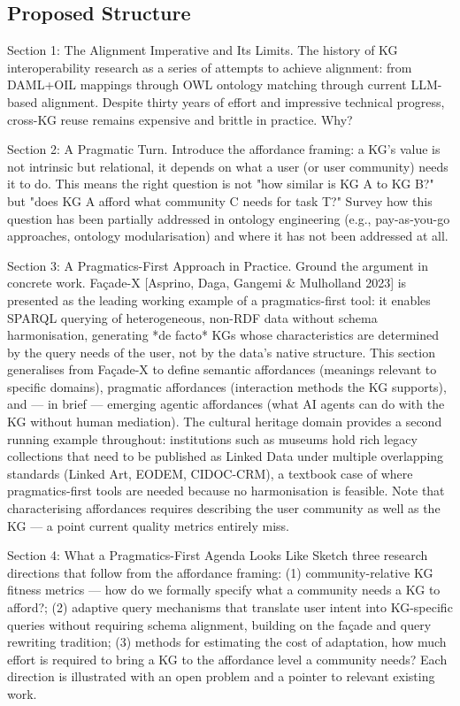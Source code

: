\subsection*{Proposed Structure}

Section 1: The Alignment Imperative and Its Limits. The history of KG interoperability research as a series of attempts to achieve alignment: from DAML+OIL mappings through OWL ontology matching through current LLM-based alignment. Despite thirty years of effort and impressive technical progress, cross-KG reuse remains expensive and brittle in practice. Why?

Section 2: A Pragmatic Turn. Introduce the affordance framing: a KG's value is not intrinsic but relational,  it depends on what a user (or user community) needs it to do. This means the right question is not "how similar is KG A to KG B?" but "does KG A afford what community C needs for task T?" Survey how this question has been partially addressed in ontology engineering (e.g., pay-as-you-go approaches, ontology modularisation) and where it has not been addressed at all.

Section 3: A Pragmatics-First Approach in Practice. Ground the argument in concrete work. Façade-X [Asprino, Daga, Gangemi \& Mulholland 2023] is presented as the leading working example of a pragmatics-first tool: it enables SPARQL querying of heterogeneous, non-RDF data without schema harmonisation, generating *de facto* KGs whose characteristics are determined by the query needs of the user, not by the data's native structure. This section generalises from Façade-X to define semantic affordances (meanings relevant to specific domains), pragmatic affordances (interaction methods the KG supports), and — in brief — emerging agentic affordances (what AI agents can do with the KG without human mediation). The cultural heritage domain provides a second running example throughout: institutions such as museums hold rich legacy collections that need to be published as Linked Data under multiple overlapping standards (Linked Art, EODEM, CIDOC-CRM), a textbook case of where pragmatics-first tools are needed because no harmonisation is feasible. Note that characterising affordances requires describing the user community as well as the KG — a point current quality metrics entirely miss.

Section 4: What a Pragmatics-First Agenda Looks Like Sketch three research directions that follow from the affordance framing: (1) community-relative KG fitness metrics — how do we formally specify what a community needs a KG to afford?; (2) adaptive query mechanisms that translate user intent into KG-specific queries without requiring schema alignment, building on the façade and query rewriting tradition; (3) methods for estimating the cost of adaptation, how much effort is required to bring a KG to the affordance level a community needs? Each direction is illustrated with an open problem and a pointer to relevant existing work.

